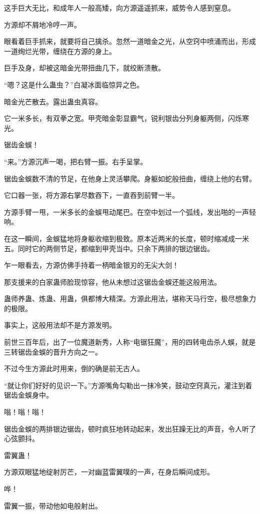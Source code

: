 \begin{this_body}
这手巨大无比，和成年人一般高矮，向方源遥遥抓来，威势令人感到窒息。

方源却不屑地冷哼一声。

眼看着巨手抓来，就要将自己擒杀。忽然一道暗金之光，从空窍中喷涌而出，形成一道绚烂光带，缠绕在方源的身上。

巨手及身，却被这暗金光带扭曲几下，就绞断溃散。

“嗯？这是什么蛊虫？”白凝冰面临惊异之色。

暗金光芒散去。露出蛊虫真容。

它一米多长，有双拳之宽。甲壳暗金彰显霸气，锐利银齿分列身躯两侧，闪烁寒光。

锯齿金蜈！

“来。”方源沉声一喝，把右臂一振。右手呈掌。

锯齿金蜈数不清的节足，在他身上灵活攀爬。身躯如蛇般扭曲，缠绕上他的右臂。

它口器一张，将方源右掌尽数吞下，一直吞到前臂一半。

方源手臂一甩，一米多长的金蜈甩动尾巴。在空中划过一个弧线，发出啪的一声轻响。

在这一瞬间，金蜈猛地将身躯收缩到极致。原本近两米的长度，顿时缩减成一米五。同时它的两侧节足，都缩到甲壳当中。只余下两排的银边锯齿。

乍一眼看去，方源仿佛手持着一柄暗金银刃的无尖大剑！

那支援来的白家蛊师脸现惊容，他从未想过这锯齿金蜈还能这般用法。

蛊师养蛊、炼蛊、用蛊，俱都博大精深。方源此用法，堪称天马行空，极尽想象力的极限。

事实上，这般用法却不是方源发明。

前世三百年后，出了一位魔道新秀，人称“电锯狂魔”，用的四转电齿杀人蜈，就是三转锯齿金蜈的晋升方向之一。

不过今生方源此时用来，倒的确是前无古人。

“就让你们好好的见识一下。”方源嘴角勾勒出一抹冷笑，鼓动空窍真元，灌注到着锯齿金蜈身中。

嗡！嗡！嗡！

锯齿金蜈的两排银边锯齿，顿时疯狂地转动起来，发出狂躁无比的声音，令人听了心弦颤抖。

雷翼蛊！

方源双眼猛地绽射厉芒，一对幽蓝雷翼噗的一声，在身后瞬间成形。

哗！

雷翼一振，带动他如电般射出。


\end{this_body}

